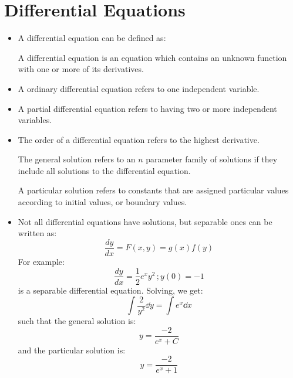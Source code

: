 \section{Differential Equations}
\begin{itemize}
    \item A differential equation can be defined as:
    \begin{definition}
        A differential equation is an equation which contains an unknown function with one or more of its derivatives.
    \end{definition}
    \item A ordinary differential equation refers to one independent variable.
    \item A partial differential equation refers to having two or more independent variables.
    \item The order of a differential equation refers to the highest derivative.
    \begin{definition}
        The general solution refers to an $n$ parameter family of solutions if they include all solutions to the differential equation.
    \end{definition}
    \begin{definition}
        A particular solution refers to constants that are assigned particular values according to initial values, or boundary values.
    \end{definition}
    \item Not all differential equations have solutions, but separable ones can be written as:
    \begin{equation}
        \frac{dy}{dx} = F(x,y) = g(x)f(y)
        \label{eq:}
    \end{equation}
    For example:
    \begin{equation}
        \frac{dy}{dx} = \frac{1}{2}e^x y^2\,; y(0)=-1
        \label{eq:}
    \end{equation}
    is a separable differential equation. Solving, we get:
    \begin{equation}
        \int \frac{2}{y^2} \dd{y} = \int e^x \dd{x}
        \label{eq:}
    \end{equation}
    such that the general solution is:
    \begin{equation}
        y = \frac{-2}{e^x+C}
        \label{eq:}
    \end{equation}
    and the particular solution is:
    \begin{equation}
        y = \frac{-2}{e^x+1}
        \label{eq:}

\end{equation}
\end{itemize}
